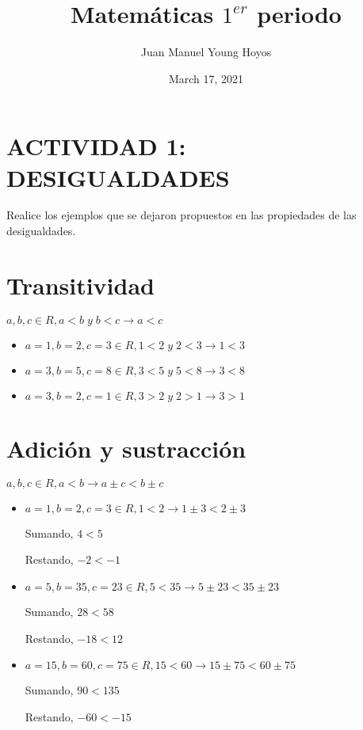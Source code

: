 \documentclass[12pt, letterpaper, twoside]{article}
\title{Matemáticas $1^{er}$ periodo}
\author{Juan Manuel Young Hoyos}
\date{March 17, 2021}
\begin{document}
\maketitle

\section*{ACTIVIDAD 1: DESIGUALDADES}

Realice los ejemplos que se dejaron propuestos en las propiedades de las desigualdades.

\section{Transitividad}

$a, b, c \in R, a < b \;y\; b < c \to a < c$

\begin{itemize}
    \item $a = 1, b = 2, c = 3 \in R, 1 < 2\;y\;2 < 3 \to 1 < 3$
    \item $a = 3, b = 5, c = 8 \in R, 3 < 5\;y\;5 < 8 \to 3 < 8$
    \item $a = 3, b = 2, c = 1 \in R, 3 > 2\;y\;2 > 1 \to 3 > 1$
\end{itemize}

\section{Adición y sustracción}

$a, b, c \in R, a < b \to a \pm c < b \pm c$
\begin{itemize}
    \item $a = 1, b = 2, c = 3 \in R, 1 < 2 \to 1 \pm 3 < 2 \pm 3$
   
    Sumando, $ 4 < 5$
    
    Restando, $ -2 < -1$

    \item $a = 5, b = 35, c = 23 \in R, 5 < 35 \to 5 \pm 23 < 35 \pm 23$

    Sumando, $ 28 < 58$
    
    Restando, $ -18 < 12$

    \item $a = 15, b = 60, c = 75 \in R, 15 < 60 \to 15 \pm 75 < 60 \pm 75$

    Sumando, $ 90 < 135$
    
    Restando, $ -60 < -15$
\end{itemize}
\end{document}
